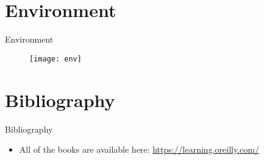 \documentclass[hyperref={hidelinks}]{beamer}
\begin{document}
  \section{Environment}
  \begin{frame}[allowframebreaks]{Environment}
    \begin{figure}
      \centering
      \texttt{[image: env]}
      \end{figure}
  \end{frame}

  \section{Bibliography}
  \begin{frame}[allowframebreaks]{Bibliography}
    \begin{itemize}
      \item All of the books are available here:
      \href{https://learning.oreilly.com/}{\url{https://learning.oreilly.com/}}
    \end{itemize}
    \nocite{halder:2018,chio:2018,parisi:2019,tsukerman:2019,mueller:2019}
    \tiny
    \printbibliography
  \end{frame}
\end{document}
